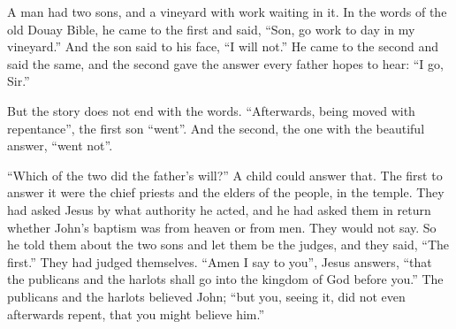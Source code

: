 %

A man had two sons, and a vineyard with work waiting in it. In the words of
the old Douay Bible, he came to the first and said, ``Son, go work to day in
my vineyard.'' And the son said to his face, ``I will not.'' He came to the
second and said the same, and the second gave the answer every father hopes to
hear: ``I go, Sir.''

But the story does not end with the words. ``Afterwards, being moved with
repentance'', the first son ``went''. And the second, the one with the
beautiful answer, ``went not''.

``Which of the two did the father's will?'' A child could answer that. The
first to answer it were the chief priests and the elders of the people, in the
temple. They had asked Jesus by what authority he acted, and he had asked them
in return whether John's baptism was from heaven or from men. They would not
say. So he told them about the two sons and let them be the judges, and they
said, ``The first.'' They had judged themselves. ``Amen I say to you'', Jesus
answers, ``that the publicans and the harlots shall go into the kingdom of God
before you.'' The publicans and the harlots believed John; ``but you, seeing
it, did not even afterwards repent, that you might believe him.''

